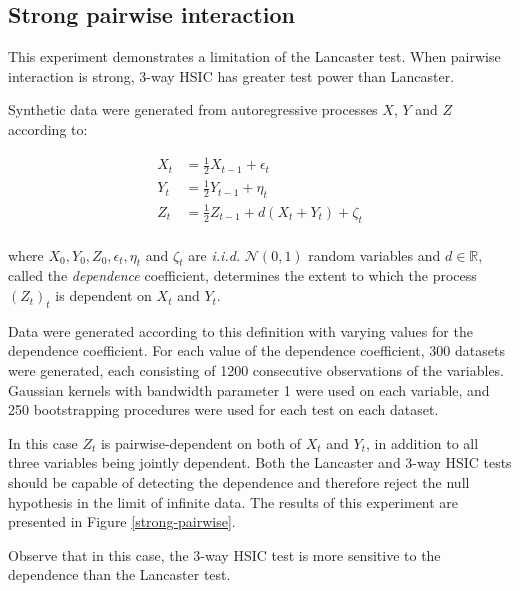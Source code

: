\documentclass[]{article}
\begin{document}
\subsection{Strong pairwise interaction}\label{experiment3}
This experiment demonstrates a limitation of the Lancaster test. When pairwise interaction is strong, 3-way HSIC has greater test power than Lancaster.

Synthetic data were generated from autoregressive processes $X$, $Y$ and $Z$ according to:

\begin{align*}
X_t &= \frac{1}{2}X_{t-1} + \epsilon_t\\
Y_t &= \frac{1}{2}Y_{t-1} + \eta_t\\
Z_t &= \frac{1}{2}Z_{t-1} + d(X_t + Y_t) + \zeta_t\\
\end{align*}

where $X_0, Y_0, Z_0, \epsilon_t, \eta_t$ and $\zeta_t$ are \emph{i.i.d. } $\mathcal{N}(0,1)$ random variables and $d\in\mathbb{R}$, called the \emph{dependence} coefficient, determines the extent to which the process $(Z_t)_t$ is dependent on $X_t$ and $Y_t$.

Data were generated according to this definition with varying values for the dependence coefficient. For each value of the dependence coefficient, 300 datasets were generated, each consisting of 1200 consecutive observations of the variables. Gaussian kernels with bandwidth parameter 1 were used on each variable, and 250 bootstrapping procedures were used for each test on each dataset.

In this case $Z_t$ is pairwise-dependent on both of $X_t$ and $Y_t$, in addition to all three variables being jointly dependent. Both the Lancaster and 3-way HSIC tests should be capable of detecting the dependence and therefore reject the null hypothesis in the limit of infinite data. The results of this experiment are presented in Figure \ref{strong-pairwise}. 

Observe that in this case, the 3-way HSIC test is more sensitive to the dependence than the Lancaster test.
\end{document}
